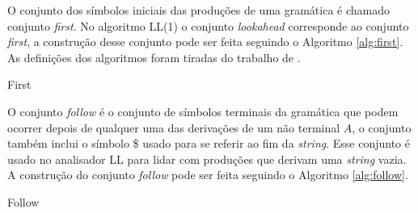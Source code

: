 O conjunto dos símbolos iniciais das produções de uma gramática é chamado conjunto \textit{first}. No algoritmo LL(1) o conjunto \textit{lookahead} corresponde ao conjunto \textit{first}, a construção desse conjunto pode ser feita seguindo o Algoritmo \ref{alg:first}. As definições dos algoritmos foram tiradas do trabalho de \textcite{thain2020introduction}.

\begin{algorithm}[ht]
    \caption{First}\label{alg:first}
\end{algorithm}

O conjunto \textit{follow} é o conjunto de símbolos terminais da gramática que podem ocorrer depois de qualquer uma das derivações de um não terminal $A$, o conjunto também inclui o símbolo \$ usado para se referir ao fim da \textit{string}. Esse conjunto é usado no analisador LL para lidar com produções que derivam uma \textit{string} vazia. A construção do conjunto \textit{follow} pode ser feita seguindo o Algoritmo \ref{alg:follow}.

\begin{algorithm}[ht]
    \caption{Follow}\label{alg:follow}
\end{algorithm}

